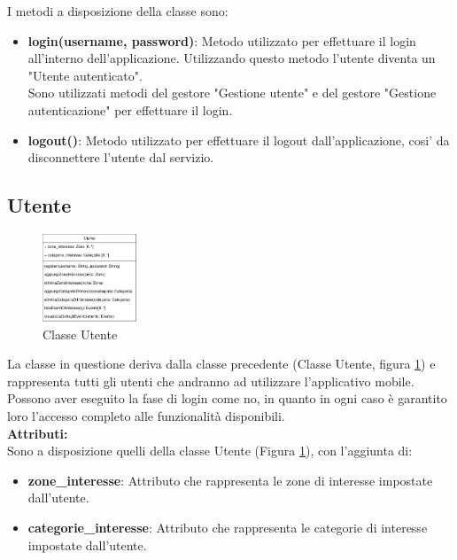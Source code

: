 I metodi a disposizione della classe sono:
\begin{itemize}
    \item \textbf{login(username, password)}: Metodo utilizzato per effettuare il login all'interno dell'applicazione. Utilizzando questo metodo l'utente diventa un "Utente autenticato".\\Sono utilizzati metodi del gestore "Gestione utente" e del gestore "Gestione autenticazione" per effettuare il login.
    \item \textbf{logout()}: Metodo utilizzato per effettuare il logout dall'applicazione, cosi' da disconnettere l'utente dal servizio.\\
\end{itemize} 

\clearpage

\subsection{Utente}

\begin{figure}[htbp]
    \centering
    \includegraphics[width=0.25\textwidth]{Images/Utente-Class.png}
    \caption{Classe Utente}
    \label{fig:utente}
\end{figure}

La classe in questione deriva dalla classe precedente (Classe Utente, figura \ref{fig:utente}) e rappresenta tutti gli utenti che andranno ad utilizzare l'applicativo mobile.\\
Possono aver eseguito la fase di login come no, in quanto in ogni caso è garantito loro l'accesso completo alle funzionalità disponibili.\\

\textbf{Attributi:}\\
Sono a disposizione quelli della classe Utente (Figura \ref{fig:utente}), con l'aggiunta di:
\begin{itemize}
    \item \textbf{zone\_interesse}: Attributo che rappresenta le zone di interesse impostate dall'utente.
    \item \textbf{categorie\_interesse}: Attributo che rappresenta le categorie di interesse impostate dall'utente.\\
\end{itemize}


